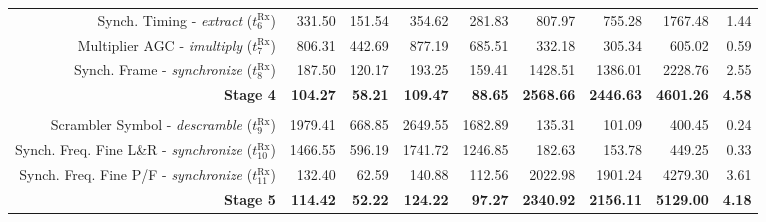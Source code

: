 \begin{table}[htp]
{{\begin{tabular}{r | r r r r  | r r r | r}
    \rowcolor{Paired-7!15}
                    Synch. Timing -       \emph{extract} ($t^\text{Rx}_{6}$)  &          331.50  &           151.54  &           354.62  &                                 281.83  &           807.97  &           755.28  &          1767.48  &          1.44  \\
                   Multiplier AGC -     \emph{imultiply} ($t^\text{Rx}_{7}$)  &          806.31  &           442.69  &           877.19  &                                 685.51  &           332.18  &           305.34  &           605.02  &          0.59  \\
    \rowcolor{Paired-7!15}
                     Synch. Frame -   \emph{synchronize} ($t^\text{Rx}_{8}$)  &          187.50  &           120.17  &           193.25  &                                 159.41  &          1428.51  &          1386.01  &          2228.76  &          2.55  \\ \hline
                                                             \textbf{Stage 4} &  \textbf{104.27} &    \textbf{58.21} &   \textbf{109.47} &                          \textbf{88.65} &  \textbf{2568.66} &  \textbf{2446.63} &  \textbf{4601.26} &  \textbf{4.58} \\ %
                                                                              &                  &                   &                   &                                         &                   &                   &                   &                \\
                 Scrambler Symbol -    \emph{descramble} ($t^\text{Rx}_{9}$)  &         1979.41  &           668.85  &          2649.55  &                                 1682.89 &           135.31  &           101.09  &           400.45  &          0.24  \\
    \rowcolor{Paired-7!15}
           Synch. Freq. Fine L\&R -   \emph{synchronize} ($t^\text{Rx}_{10}$) &         1466.55  &           596.19  &          1741.72  &                                 1246.85 &           182.63  &           153.78  &           449.25  &          0.33  \\
            Synch. Freq. Fine P/F -   \emph{synchronize} ($t^\text{Rx}_{11}$) &          132.40  &            62.59  &           140.88  &                                  112.56 &          2022.98  &          1901.24  &          4279.30  &          3.61  \\ \hline
                                                             \textbf{Stage 5} &  \textbf{114.42} &    \textbf{52.22} &   \textbf{124.22} &                          \textbf{97.27} &  \textbf{2340.92} &  \textbf{2156.11} &  \textbf{5129.00} &  \textbf{4.18} \\ %

\end{tabular}}}
\end{table}
